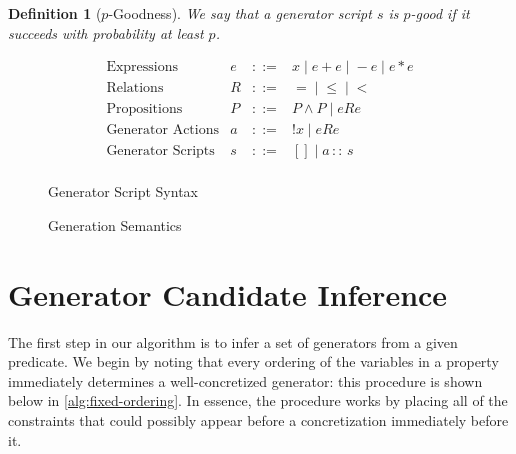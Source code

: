 \documentclass[10pt,a4paper]{article}
\newtheorem{definition}{Definition}
\begin{document}
\begin{definition}[$p$-Goodness]
We say that a generator script $s$ is $p$-good if it succeeds with probability at least $p$.
\end{definition}

\begin{figure}
\caption{Generator Script Syntax}
\label{fig:aluck-syntax}
$$
\begin{array}{llll}
\text{Expressions} & e & ::= & x \; | \; e + e \; | \; -e \;|\; e*e\\
\text{Relations} & R & ::= & = \;|\; \leq \;|\; <\\
\text{Propositions} & P & ::= & P \wedge P \;|\; e R e\\
\text{Generator Actions} & a & ::= & !x \;|\; e R e\\
\text{Generator Scripts} & s & ::= & [] \;|\; a \, :: \, s\\
\end{array}
$$
\end{figure}

\begin{figure}
\caption{Generation Semantics}
\label{fig:aluck-semantics}
\begin{mathpar}


\end{mathpar}
\end{figure}

\section{Generator Candidate Inference}
\label{sec:sci}
The first step in our algorithm is to infer a set of generators from a given predicate. We begin by noting that every ordering of the variables in a property immediately determines a well-concretized generator: this procedure is shown below in \autoref{alg:fixed-ordering}. In essence, the procedure works by placing all of the constraints that could possibly appear before a concretization immediately before it.
\end{document}
